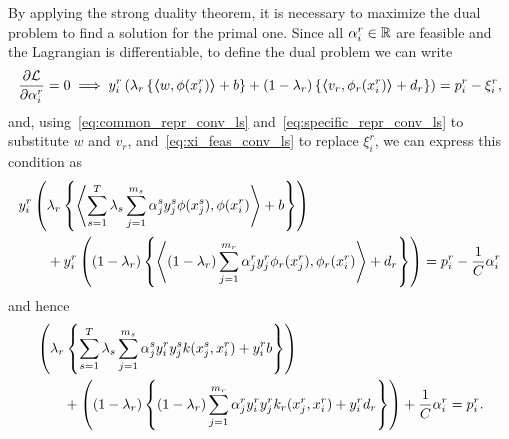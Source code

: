 By applying the strong duality theorem, it is necessary to maximize the dual problem to find a solution for the primal one. Since all $\alpha_i^r \in \mathbb{R}$ are feasible and the Lagrangian is differentiable, to define the dual problem we can write
\begin{equation}
    \nonumber
    \frac{\partial \mathcal{L}}{\partial \alpha_i^r} = 0 \implies y_{i}^r \left(\lambda_r \left\lbrace \bm{\left\langle} w, \phi(x_{i}^r) \bm{\right\rangle} + b  \right\rbrace + (1 - \lambda_r) \left\lbrace \bm{\left\langle} {v}_r, \phi_r(x_{i}^r) \bm{\right\rangle} + d_r \right\rbrace  \right) = p_{i}^r - \xi_{i}^r  ,
\end{equation}
and, using~\eqref{eq:common_repr_conv_ls} and~\eqref{eq:specific_repr_conv_ls} to substitute $w$ and $v_r$, and~\eqref{eq:xi_feas_conv_ls} to replace $\xi_i^r$, we can express this condition as 
\begin{equation}
    \nonumber
    \begin{aligned}
        &y_{i}^r \left(\lambda_r \left\lbrace \left\langle\sum_{s= 1}^T \lambda_s \sum_{j=1}^{m_s} {\alpha_j^s} y_j^s \phi(x_j^s) , \phi(x_{i}^r) \right\rangle + b \right\rbrace \right) \\
        &\qquad+ y_{i}^r \left( (1 - \lambda_r) \left\lbrace \left\langle (1 - \lambda_r) \sum_{j=1}^{m_r} {\alpha_j^r}  y_j^r \phi_r(x_j^r) , \phi_r(x_{i}^r) \right\rangle + d_r \right\rbrace  \right) = p_{i}^r - \frac{1}{C}\alpha_{i}^r  \\
    \end{aligned}
\end{equation}
and hence
\begin{equation}
    \nonumber
    \begin{aligned}
        &\left(\lambda_r \left\lbrace \sum_{s= 1}^T \lambda_s \sum_{j=1}^{m_s} {\alpha_j^s} y_{i}^r y_j^s k(x_j^s, x_{i}^r)  + y_i^r b \right\rbrace \right) \\
        &\qquad+  \left( (1 - \lambda_r) \left\lbrace (1 - \lambda_r) \sum_{j=1}^{m_r} {\alpha_j^r} y_{i}^r  y_j^r k_r(x_j^r, x_{i}^r)  + y_i^r d_r \right\rbrace  \right) + \frac{1}{C}\alpha_{i}^r  = p_{i}^r .
    \end{aligned}
\end{equation}


